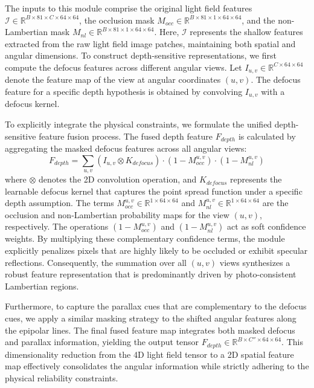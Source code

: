 The inputs to this module comprise the original light field features $\mathcal{I} \in \mathbb{R}^{B \times 81 \times C \times 64 \times 64}$, the occlusion mask $M_{occ} \in \mathbb{R}^{B \times 81 \times 1 \times 64 \times 64}$, and the non-Lambertian mask $M_{nl} \in \mathbb{R}^{B \times 81 \times 1 \times 64 \times 64}$. Here, $\mathcal{I}$ represents the shallow features extracted from the raw light field image patches, maintaining both spatial and angular dimensions. To construct depth-sensitive representations, we first compute the defocus features across different angular views. Let $I_{u,v} \in \mathbb{R}^{C \times 64 \times 64}$ denote the feature map of the view at angular coordinates $(u,v)$. The defocus feature for a specific depth hypothesis is obtained by convolving $I_{u,v}$ with a defocus kernel.

To explicitly integrate the physical constraints, we formulate the unified depth-sensitive feature fusion process. The fused depth feature $F_{depth}$ is calculated by aggregating the masked defocus features across all angular views:
\begin{equation}
\label{eq:eq25}
F_{depth} = \sum_{u,v} (I_{u,v} \otimes K_{defocus}) \cdot (1 - M_{occ}^{u,v}) \cdot (1 - M_{nl}^{u,v})
\end{equation}
where $\otimes$ denotes the 2D convolution operation, and $K_{defocus}$ represents the learnable defocus kernel that captures the point spread function under a specific depth assumption. The terms $M_{occ}^{u,v} \in \mathbb{R}^{1 \times 64 \times 64}$ and $M_{nl}^{u,v} \in \mathbb{R}^{1 \times 64 \times 64}$ are the occlusion and non-Lambertian probability maps for the view $(u,v)$, respectively. The operations $(1 - M_{occ}^{u,v})$ and $(1 - M_{nl}^{u,v})$ act as soft confidence weights. By multiplying these complementary confidence terms, the module explicitly penalizes pixels that are highly likely to be occluded or exhibit specular reflections. Consequently, the summation over all $(u,v)$ views synthesizes a robust feature representation that is predominantly driven by photo-consistent Lambertian regions.

Furthermore, to capture the parallax cues that are complementary to the defocus cues, we apply a similar masking strategy to the shifted angular features along the epipolar lines. The final fused feature map integrates both masked defocus and parallax information, yielding the output tensor $F_{depth} \in \mathbb{R}^{B \times C'' \times 64 \times 64}$. This dimensionality reduction from the 4D light field tensor to a 2D spatial feature map effectively consolidates the angular information while strictly adhering to the physical reliability constraints. 

